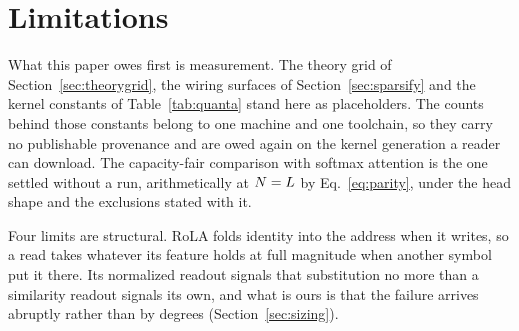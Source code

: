 %
%
%
\section{Limitations}
\label{sec:limitations}

What this paper owes first is measurement. The theory grid of Section~\ref{sec:theorygrid}, the wiring surfaces of Section~\ref{sec:sparsify} and the kernel constants of Table~\ref{tab:quanta} stand here as placeholders. The counts behind those constants belong to one machine and one toolchain, so they carry no publishable provenance and are owed again on the kernel generation a reader can download. The capacity-fair comparison with softmax attention is the one settled without a run, arithmetically at $N = L$ by Eq.~\eqref{eq:parity}, under the head shape and the exclusions stated with it.

Four limits are structural. RoLA folds identity into the address when it writes, so a read takes whatever its feature holds at full magnitude when another symbol put it there. Its normalized readout signals that substitution no more than a similarity readout signals its own, and what is ours is that the failure arrives abruptly rather than by degrees (Section~\ref{sec:sizing}).

